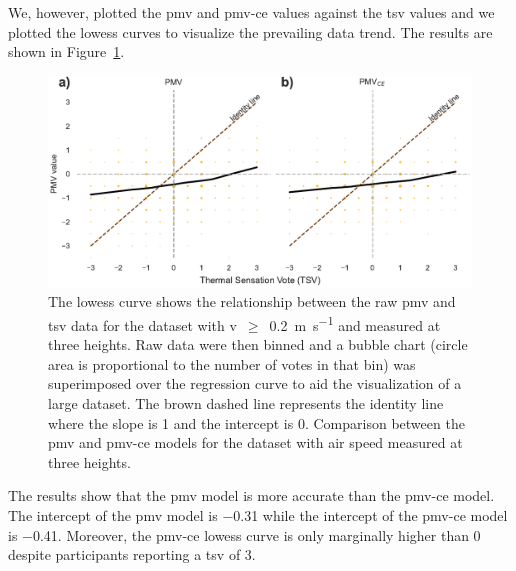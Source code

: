 We, however, plotted the \ac{pmv} and \ac{pmv-ce} values against the \ac{tsv} values and we plotted the \ac{lowess} curves to visualize the prevailing data trend.
The results are shown in Figure~\ref{fig:bubble_models_vs_tsv_three_heights}.
\begin{figure}[htb!]
    \centering
    \includegraphics[width=\textwidth]{figures/bubble_models_vs_tsv_three_heights}
    \caption{The \ac{lowess} curve shows the relationship between the raw \ac{pmv} and \ac{tsv} data for the dataset with \ac{v}~$\geq$~\qty{0.2}{\m\per\s} and measured at three heights.
    Raw data were then binned and a bubble chart (circle area is proportional to the number of votes in that bin) was superimposed over the regression curve to aid the visualization of a large dataset.
    The brown dashed line represents the identity line where the slope is 1 and the intercept is 0.
    Comparison between the \ac{pmv} and \ac{pmv-ce} models for the dataset with air speed measured at three heights.}
    \label{fig:bubble_models_vs_tsv_three_heights}
\end{figure}
The results show that the \ac{pmv} model is more accurate than the \ac{pmv-ce} model.
The intercept of the \ac{pmv} model is \num{-.31} while the intercept of the \ac{pmv-ce} model is \num{-.41}.
Moreover, the \ac{pmv-ce} \ac{lowess} curve is only marginally higher than \num{0} despite participants reporting a \ac{tsv} of \num{3}.

